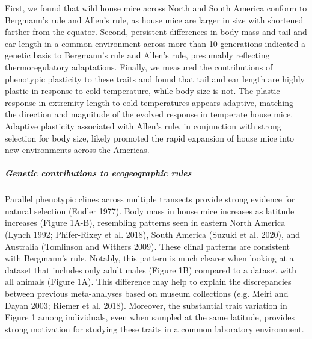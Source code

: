 \documentclass[]{article}
\let\oldsubparagraph\subparagraph
\renewcommand{\subparagraph}[1]{\oldsubparagraph{#1}\mbox{}}
\begin{document}
First, we found that wild house mice across North and South America
conform to Bergmann's rule and Allen's rule, as house mice are larger in
size with shortened farther from the equator. Second, persistent
differences in body mass and tail and ear length in a common environment
across more than 10 generations indicated a genetic basis to Bergmann's
rule and Allen's rule, presumably reflecting thermoregulatory
adaptations. Finally, we measured the contributions of phenotypic
plasticity to these traits and found that tail and ear length are highly
plastic in response to cold temperature, while body size is not. The
plastic response in extremity length to cold temperatures appears
adaptive, matching the direction and magnitude of the evolved response
in temperate house mice. Adaptive plasticity associated with Allen's
rule, in conjunction with strong selection for body size, likely
promoted the rapid expansion of house mice into new environments across
the Americas.

\vspace{2.5mm}

\hypertarget{genetic-contributions-to-ecogeographic-rules}{%
\subparagraph{\texorpdfstring{\emph{Genetic contributions to
ecogeographic
rules}}{Genetic contributions to ecogeographic rules}}\label{genetic-contributions-to-ecogeographic-rules}}

Parallel phenotypic clines across multiple transects provide strong
evidence for natural selection (Endler 1977). Body mass in house mice
increases as latitude increases (Figure 1A-B), resembling patterns seen
in eastern North America (Lynch 1992; Phifer-Rixey et al. 2018), South
America (Suzuki et al. 2020), and Australia (Tomlinson and Withers
2009). These clinal patterns are consistent with Bergmann's rule.
Notably, this pattern is much clearer when looking at a dataset that
includes only adult males (Figure 1B) compared to a dataset with all
animals (Figure 1A). This difference may help to explain the
discrepancies between previous meta-analyses based on museum collections
(e.g. Meiri and Dayan 2003; Riemer et al. 2018). Moreover, the
substantial trait variation in Figure 1 among individuals, even when
sampled at the same latitude, provides strong motivation for studying
these traits in a common laboratory environment.
\end{document}
